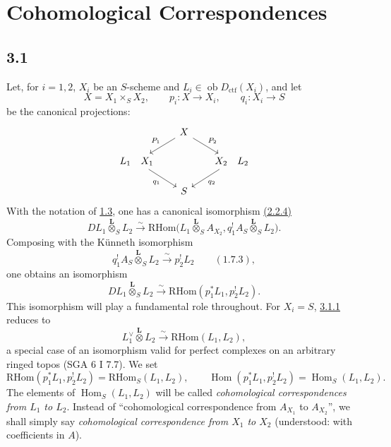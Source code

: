 \documentclass[11pt]{article}
\DeclareMathOperator{\Hom}{Hom}
\newcommand{\ob}{\operatorname{ob}}
\providecommand{\RHom}{\mathrm{RHom}}
\providecommand{\Dctf}{D_{\mathrm{ctf}}}
\providecommand{\Dctf}{D_{\mathrm{ctf}}}
\providecommand{\RHom}{\mathrm{RHom}}
\providecommand{\Hom}{\operatorname{Hom}}
\providecommand{\ob}{\operatorname{ob}}
\providecommand{\RHom}{\mathrm R\mathcal{H}om}
\providecommand{\RHom}{\mathrm{RHom}}
\providecommand{\Hom}{\operatorname{Hom}}
\begin{document}
\clearpage
\section{Cohomological Correspondences}

\subsection*{3.1}\label{sga5:III:subsection:3.1}
Let, for $i=1,2$, $X_i$ be an $S$-scheme and $L_i\in\ob\Dctf(X_i)$, and let
\[
X=X_1\times_S X_2,
\qquad
p_i:X\longrightarrow X_i,
\qquad
q_i:X_i\longrightarrow S
\]
be the canonical projections:
\[
\begin{tikzcd}[column sep=1.8em,row sep=1.5em]
& X \arrow[dl,"P_1"'] \arrow[dr,"P_2"] & \\
L_1\quad X_1 \arrow[dr,"q_1"'] & & X_2\quad L_2 \arrow[dl,"q_2"] \\
& S &
\end{tikzcd}
\]
With the notation of \hyperref[sga5:III:subsection:1.3]{1.3}, one has a canonical isomorphism \hyperref[sga5:III:equation:2.2.4]{(2.2.4)}
\[
DL_1\overset{\mathbf L}{\otimes}_S L_2
\xrightarrow{\sim}
\RHom\bigl(L_1\overset{\mathbf L}{\otimes}_S A_{X_2},
q_1^!A_S\overset{\mathbf L}{\otimes}_S L_2\bigr).
\]
Composing with the Künneth isomorphism
\[
q_1^!A_S\overset{\mathbf L}{\otimes}_S L_2
\xrightarrow{\sim}p_2^!L_2 \qquad \hyperref[sga5:III:equation:1.7.3]{(1.7.3)},
\]
one obtains an isomorphism
\begin{equation}
DL_1\overset{\mathbf L}{\otimes}_S L_2
\xrightarrow{\sim}
\RHom(p_1^*L_1,p_2^!L_2).
\tag{3.1.1}\label{sga5:III:equation:3.1.1}
\end{equation}
This isomorphism will play a fundamental role throughout. For $X_i=S$, \hyperref[sga5:III:equation:3.1.1]{3.1.1} reduces to
\[
L_1^\vee\overset{\mathbf L}{\otimes}L_2\xrightarrow{\sim}\RHom(L_1,L_2),
\]
a special case of an isomorphism valid for perfect complexes on an arbitrary ringed topos (SGA 6 I 7.7). We set
\begin{equation}
\RHom(p_1^*L_1,p_2^!L_2)=\RHom_S(L_1,L_2),
\qquad
\Hom(p_1^*L_1,p_2^!L_2)=\Hom_S(L_1,L_2).
\tag{3.1.2}\label{sga5:III:equation:3.1.2}
\end{equation}
The elements of $\Hom_S(L_1,L_2)$ will be called \emph{cohomological correspondences from $L_1$ to $L_2$}. Instead of ``cohomological correspondence from $A_{X_1}$ to $A_{X_2}$'', we shall simply say \emph{cohomological correspondence from $X_1$ to $X_2$} (understood: with coefficients in $A$).
\end{document}
